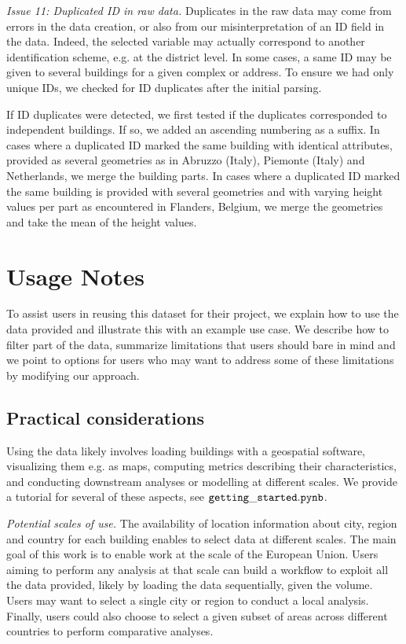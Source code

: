 \documentclass[fleqn,10pt]{wlscirep}
\begin{document}
\medskip \noindent \textit{Issue 11: Duplicated ID in raw data.} \hspace{0.1cm} Duplicates in the raw data may come from errors in the data creation, or also from our misinterpretation of an ID field in the data. Indeed, the selected variable may actually correspond to another identification scheme, e.g. at the district level. In some cases, a same ID may be given to several buildings for a given complex or address. To ensure we had only unique IDs, we checked for ID duplicates after the initial parsing. 

If ID duplicates were detected, we first tested if the duplicates corresponded to independent buildings. If so, we added an ascending numbering as a suffix. In cases where a duplicated ID marked the same building with identical attributes, provided as several geometries as in Abruzzo (Italy), Piemonte (Italy) and Netherlands, we merge the building parts. In cases where a duplicated ID marked the same building is provided with several geometries and with varying height values per part as encountered in Flanders, Belgium, we merge the geometries and take the mean of the height values.     


\section*{Usage Notes}
To assist users in reusing this dataset for their project, we explain how to use the data provided and illustrate this with an example use case. We describe how to filter part of the data, summarize limitations that users should bare in mind and we point to options for users who may want to address some of these limitations by modifying our approach.   

\subsection*{Practical considerations}
Using the data likely involves loading buildings with a geospatial software, visualizing them e.g. as maps, computing metrics describing their characteristics, and conducting downstream analyses or modelling at different scales. We provide a tutorial for several of these aspects, see ${\tt getting\_started.pynb}$\cite{eubucco-0.1-code2022}.


\medskip \noindent \textit{Potential scales of use.} \hspace{0.1cm}
The availability of location information about city, region and country for each building enables to select data at different scales. The main goal of this work is to enable work at the scale of the European Union. Users aiming to perform any analysis at that scale can build a workflow to exploit all the data provided, likely by loading the data sequentially, given the volume. 
Users may want to select a single city or region to conduct a local analysis. Finally, users could also choose to select a given subset of areas across different countries to perform comparative analyses.
\end{document}

